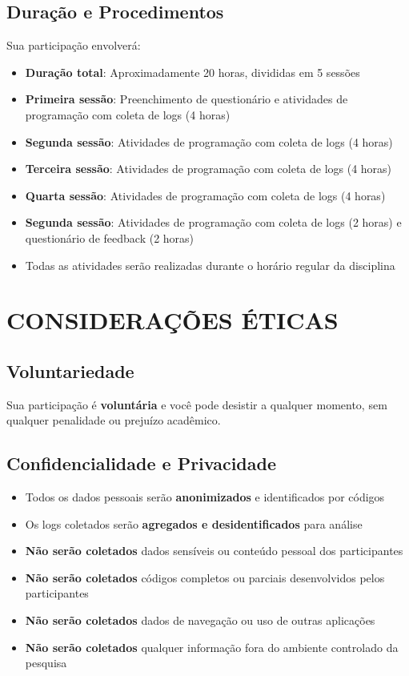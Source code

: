 \documentclass[12pt,a4paper]{article}
\begin{document}
	\subsection{Duração e Procedimentos}
	Sua participação envolverá:
	\begin{itemize}
		\item \textbf{Duração total}: Aproximadamente 20 horas, divididas em 5 sessões
		\item \textbf{Primeira sessão}: Preenchimento de questionário e atividades de programação com coleta de logs (4 horas)
		\item \textbf{Segunda sessão}: Atividades de programação com coleta de logs (4 horas)
		\item \textbf{Terceira sessão}: Atividades de programação com coleta de logs (4 horas)
		\item \textbf{Quarta sessão}: Atividades de programação com coleta de logs (4 horas)
		\item \textbf{Segunda sessão}: Atividades de programação com coleta de logs (2 horas) e questionário de feedback (2 horas)
		\item Todas as atividades serão realizadas durante o horário regular da disciplina
	\end{itemize}
	
	\section{CONSIDERAÇÕES ÉTICAS}
	
	\subsection{Voluntariedade}
	Sua participação é \textbf{voluntária} e você pode desistir a qualquer momento, sem qualquer penalidade ou prejuízo acadêmico.
	
	\subsection{Confidencialidade e Privacidade}
	\begin{itemize}
		\item Todos os dados pessoais serão \textbf{anonimizados} e identificados por códigos
		\item Os logs coletados serão \textbf{agregados e desidentificados} para análise
		\item \textbf{Não serão coletados} dados sensíveis ou conteúdo pessoal dos participantes
		\item \textbf{Não serão coletados} códigos completos ou parciais desenvolvidos pelos participantes
		\item \textbf{Não serão coletados} dados de navegação ou uso de outras aplicações
		\item \textbf{Não serão coletados} qualquer informação fora do ambiente controlado da pesquisa
	\end{itemize}
	
\end{document}
